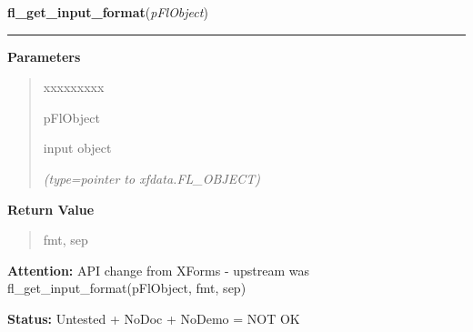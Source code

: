 \hspace{.8\funcindent}\begin{boxedminipage}{\funcwidth}

    \raggedright \textbf{fl\_get\_input\_format}(\textit{pFlObject})

    \vspace{-1.5ex}

    \rule{\textwidth}{0.5\fboxrule}
\setlength{\parskip}{2ex}
\setlength{\parskip}{1ex}
      \textbf{Parameters}
      \vspace{-1ex}

      \begin{quote}
        \begin{Ventry}{xxxxxxxxx}

          \item[pFlObject]

          input object

            {\it (type=pointer to xfdata.FL\_OBJECT)}

        \end{Ventry}

      \end{quote}

      \textbf{Return Value}
    \vspace{-1ex}

      \begin{quote}
      fmt, sep

      \end{quote}

\textbf{Attention:} API change from XForms - upstream was fl\_get\_input\_format(pFlObject, 
fmt, sep)



\textbf{Status:} Untested + NoDoc + NoDemo = NOT OK



    \end{boxedminipage}

    \label{xformslib:flinput:fl_get_input}

    \vspace{0.5ex}

